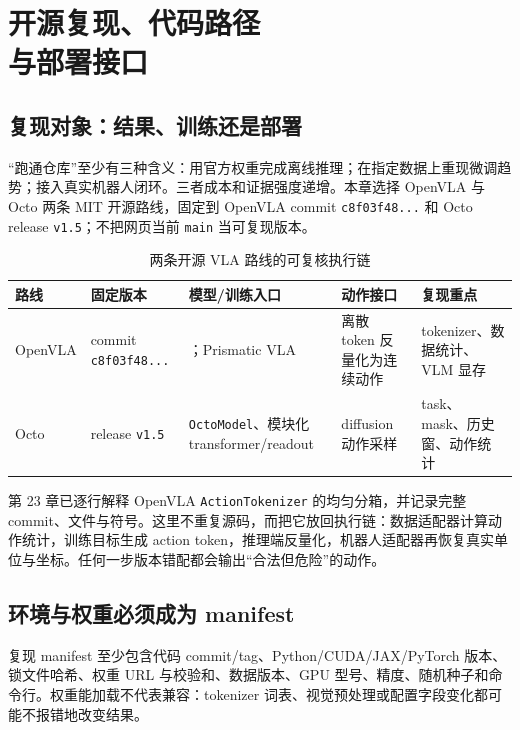 \chapter[开源复现、代码路径与部署接口]{开源复现、代码路径\\与部署接口}
\label{chap:vla-reproduction}

\section{复现对象：结果、训练还是部署}

“跑通仓库”至少有三种含义：用官方权重完成离线推理；在指定数据上重现微调趋势；接入真实机器人闭环。三者成本和证据强度递增。本章选择 OpenVLA 与 Octo 两条 MIT 开源路线，固定到 OpenVLA commit \texttt{c8f03f48...} 和 Octo release \texttt{v1.5}；不把网页当前 \texttt{main} 当可复现版本\cite{openvla2024code,octo15code}。

\begin{table}[H]
\centering
\caption{两条开源 VLA 路线的可复核执行链}
\label{tab:open-vla-repro-paths}
\begin{tabularx}{\textwidth}{p{}YYYY}
\toprule
路线 & 固定版本 & 模型/训练入口 & 动作接口 & 复现重点 \\
\midrule
OpenVLA & commit \texttt{c8f03f48...} & ；Prismatic VLA & 离散 token 反量化为连续动作 & tokenizer、数据统计、VLM 显存 \\
Octo & release \texttt{v1.5} & \texttt{OctoModel}、模块化 transformer/readout & diffusion 动作采样 & task、mask、历史窗、动作统计 \\
\bottomrule
\end{tabularx}
\end{table}

第 23 章已逐行解释 OpenVLA \texttt{ActionTokenizer} 的均匀分箱，并记录完整 commit、文件与符号。这里不重复源码，而把它放回执行链：数据适配器计算动作统计，训练目标生成 action token，推理端反量化，机器人适配器再恢复真实单位与坐标。任何一步版本错配都会输出“合法但危险”的动作。

\section{环境与权重必须成为 manifest}

复现 manifest 至少包含代码 commit/tag、Python/CUDA/JAX/PyTorch 版本、锁文件哈希、权重 URL 与校验和、数据版本、GPU 型号、精度、随机种子和命令行。权重能加载不代表兼容：tokenizer 词表、视觉预处理或配置字段变化都可能不报错地改变结果。

